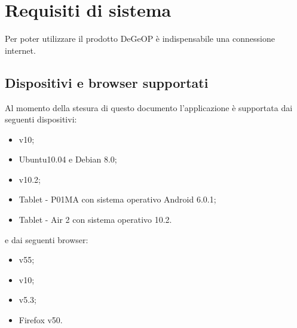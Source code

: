 \section{Requisiti di sistema}
Per poter utilizzare il prodotto DeGeOP è indispensabile una connessione internet.
	\subsection{Dispositivi e browser supportati}
		Al momento della stesura di questo documento l'applicazione è supportata dai seguenti dispositivi:
		\begin{itemize}
			\item {} v10;
			\item {} Ubuntu10.04 e Debian 8.0;
			\item {} v10.2;
			\item Tablet -  P01MA con sistema operativo Android 6.0.1;
			\item Tablet -  Air 2 con sistema operativo  10.2.
		\end{itemize}
		e dai seguenti browser:
		\begin{itemize}
			\item {} v55;
			\item {} v10;
			\item {} v5.3;
			\item Firefox v50.
		\end{itemize}
	
	